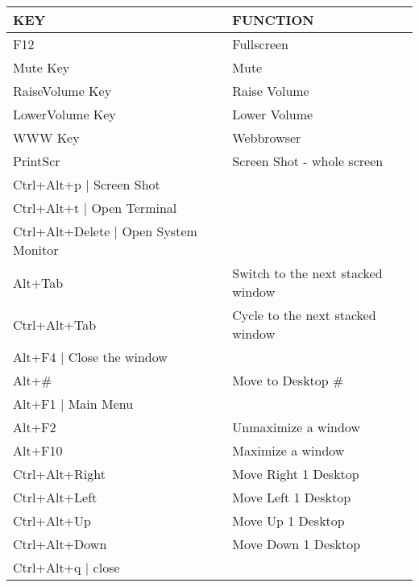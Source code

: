 \documentclass{article}
\begin{document}
\maketitle
\clearpage


\begin{center}\begin{tabular}{|l|l|}
\hline \textbf{KEY} & \textbf{FUNCTION} \\
\hline F12 & Fullscreen \\
\hline Mute Key & Mute \\
\hline RaiseVolume Key & Raise Volume \\
\hline LowerVolume Key & Lower Volume \\
\hline WWW Key & Webbrowser \\
\hline PrintScr & Screen Shot - whole screen \\
\hline Ctrl+Alt+p $|$	Screen Shot \\
\hline Ctrl+Alt+t $|$	 Open Terminal \\
\hline Ctrl+Alt+Delete	$|$ Open System Monitor \\
\hline Alt+Tab & Switch to the next stacked window \\
\hline Ctrl+Alt+Tab & Cycle to the next stacked window \\
\hline Alt+F4 $|$	Close the window \\
\hline Alt+\# & Move to Desktop \# \\
\hline Alt+F1 $|$	Main Menu \\
\hline Alt+F2 & Unmaximize a window \\
\hline Alt+F10 & Maximize a window \\
\hline Ctrl+Alt+Right & Move Right 1 Desktop \\
\hline Ctrl+Alt+Left & Move Left 1 Desktop \\
\hline Ctrl+Alt+Up & Move Up 1 Desktop \\
\hline Ctrl+Alt+Down & Move Down 1 Desktop \\
\hline Ctrl+Alt+q $|$	close \\
\hline \end{tabular}\end{center}

\end{document}

